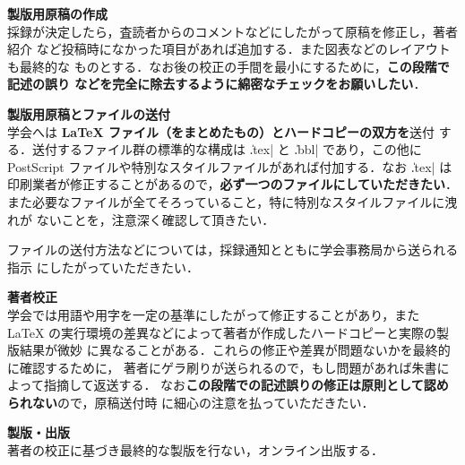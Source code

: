 \begin{Enumerate}
\item {\bf 製版用原稿の作成}\\
採録が決定したら，査読者からのコメントなどにしたがって原稿を修正し，著者紹介
など投稿時になかった項目があれば追加する．また図表などのレイアウトも最終的な
ものとする．なお後の校正の手間を最小にするために，{\bf この段階で記述の誤り
などを完全に除去するように綿密なチェックをお願いしたい}．

\item {\bf 製版用原稿とファイルの送付}\\
学会へは {\bf {\LaTeX} ファイル（をまとめたもの）とハードコピーの双方を}送付
する．送付するファイル群の標準的な構成は \|.tex| と \|.bbl| であり，この他に 
PostScript ファイルや特別なスタイルファイルがあれば付加する．なお \|.tex| は
印刷業者が修正することがあるので，{\bf 必ず一つのファイルにしていただきたい}．
また必要なファイルが全てそろっていること，特に特別なスタイルファイルに洩れが
ないことを，注意深く確認して頂きたい．

ファイルの送付方法などについては，採録通知とともに学会事務局から送られる指示
にしたがっていただきたい．

\item {\bf 著者校正}\\
学会では用語や用字を一定の基準にしたがって修正することがあり，また {\LaTeX}
の実行環境の差異などによって著者が作成したハードコピーと実際の製版結果が微妙
に異なることがある．これらの修正や差異が問題ないかを最終的に確認するために，
著者にゲラ刷りが送られるので，もし問題があれば朱書によって指摘して返送する．
なお{\bf この段階での記述誤りの修正は原則として認められない}ので，原稿送付時
に細心の注意を払っていただきたい．

\item {\bf 製版・出版}\\
著者の校正に基づき最終的な製版を行ない，オンライン出版する．
\end{Enumerate}%


